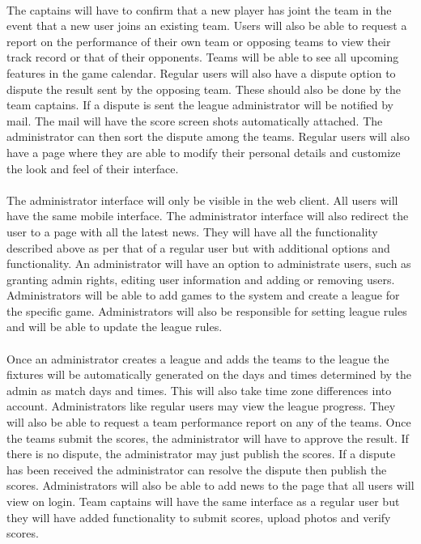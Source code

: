 \documentclass[11pt,a4paper]{article}
\begin{document}
\paragraph{}
The captains will have to confirm that a new player has joint the team in the event that a new user joins an existing team. Users will also be able to request a report on the performance of their own team or opposing teams to view their track record or that of their opponents. Teams will be able to see all upcoming features in the game calendar. Regular users will also have a dispute option to dispute the result sent by the opposing team. These should also be done by the team captains. If a dispute is sent the league administrator will be notified by mail. The mail will have the score screen shots automatically attached. The administrator can then sort the dispute among the teams. Regular users will also have a page where they are able to modify their personal details and customize the look and feel of their interface.	

\paragraph{}
The administrator interface will only be visible in the web client. All users will have the same mobile interface. The administrator interface will also redirect the user to a page with all the latest news. They will have all the functionality described above as per that of a regular user but with additional options and functionality.
An administrator will have an option to administrate users, such as granting admin rights, editing user information and adding or removing users. Administrators will be able to add games to the system and create a league for the specific game. Administrators will also be responsible for setting league rules and will be able to update the league rules.

\paragraph{}
Once an administrator creates a league and adds the teams to the league the fixtures will be automatically generated on the days and times determined by the admin as match days and times. This will also take time zone differences into account. Administrators like regular users may view the league progress. They will also be able to request a team performance report on any of the teams. Once the teams submit the scores, the administrator will have to approve the result. If there is no dispute, the administrator may just publish the scores. If a dispute has been received the administrator can resolve the dispute then publish the scores. Administrators will also be able to add news to the page that all users will view on login. Team captains will have the same interface as a regular user but they will have added functionality to submit scores, upload photos and verify scores.		
\end{document}
